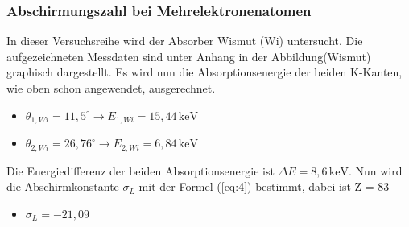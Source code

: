 \subsubsection{Abschirmungszahl bei Mehrelektronenatomen}
In dieser Versuchsreihe wird der Absorber Wismut (Wi) untersucht.
Die aufgezeichneten Messdaten sind unter Anhang in der Abbildung(Wismut) graphisch dargestellt.
Es wird nun die Absorptionsenergie der beiden K-Kanten, wie oben schon angewendet, ausgerechnet.
\begin{itemize}
  \item $\theta_{1,Wi} = 11,5^\circ \rightarrow E_{1,Wi} = 15,44 \,\text{keV}$
  \item $\theta_{2,Wi} = 26,76^\circ \rightarrow E_{2,Wi} = 6,84 \,\text{keV}$
\end{itemize}
Die Energiedifferenz der beiden Absorptionsenergie ist $\Delta E = 8,6 \,\text{keV}$.
Nun wird die Abschirmkonstante $\sigma_L$ mit der Formel (\ref{eq:4}) bestimmt, dabei ist Z = 83
\begin{itemize}
  \item $\sigma_L = -21,09$
\end{itemize}
